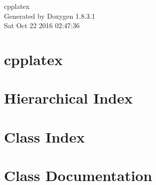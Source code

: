 \documentclass{book}
\begin{document}
\hypersetup{pageanchor=false,citecolor=blue}
\begin{titlepage}
\vspace*{7cm}
\begin{center}
{\Large cpplatex }\\
\vspace*{1cm}
{\large Generated by Doxygen 1.8.3.1}\\
\vspace*{0.5cm}
{\small Sat Oct 22 2016 02:47:36}\\
\end{center}
\end{titlepage}
\clearemptydoublepage
{}
\tableofcontents
\clearemptydoublepage
{}
\hypersetup{pageanchor=true,citecolor=blue}
\chapter{cpplatex}
\label{md_README}
\hypertarget{md_README}{}

\chapter{Hierarchical Index}

\chapter{Class Index}

\chapter{Class Documentation}




































\printindex
\end{document}
